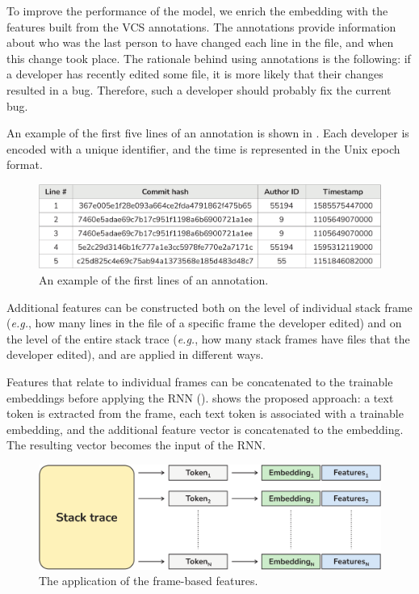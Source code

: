 \label{sec:manual-features}

To improve the performance of the model, we enrich the embedding with the features built from the VCS annotations. 
The annotations provide information about who was the last person to have changed each line in the file, and when this change took place. The rationale behind using annotations is the following: if a developer has recently edited some file, it is more likely that their changes resulted in a bug. Therefore, such a developer should probably fix the current bug. 

An example of the first five lines of an annotation is shown in . Each developer is encoded with a unique identifier, and the time is represented in the Unix epoch format. 

\begin{figure}[htbp]
    \centering
    \includegraphics[width=\columnwidth]{figures/03-approach/annotation.pdf}
    \centering
    \vspace{-0.2cm}
    \caption{An example of the first lines of an annotation.}
    \label{fig:annotation-example}
\end{figure}

Additional features can be constructed both on the level of individual stack frame (\textit{e.g.}, how many lines in the file of a specific frame the developer edited) and on the level of the entire stack trace (\textit{e.g.}, how many stack frames have files that the developer edited), and are applied in different ways.

Features that relate to individual frames can be concatenated to the trainable embeddings before applying the RNN ().  shows the proposed approach: a text token is extracted from the frame, each text token is associated with a trainable embedding, and the additional feature vector is concatenated to the embedding. The resulting vector becomes the input of the RNN.
    
    \begin{figure}[htbp]
        \centering
        \includegraphics[width=\columnwidth]{figures/03-approach/frame-features.pdf}
        \vspace{-0.4cm}
        \centering
        \caption{The application of the frame-based features.}
        \label{fig:approach-frame-features}
    \end{figure}
    
